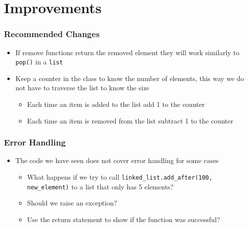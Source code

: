 \documentclass[11pt]{beamer}
\begin{document}
\section{Improvements}

	\begin{frame}
		\frametitle{Recommended Changes}
		\begin{itemize}
			\item If remove functions return the removed element they will work similarly to \texttt{pop()} in a \texttt{list} 
			\item Keep a counter in the class to know the number of elements, this way we do not have to traverse the list to know the size 
			\begin{itemize}
				\item Each time an item is added to the list add 1 to the counter
				\item Each time an item is removed from the list subtract 1 to the counter
			\end{itemize}
		\end{itemize}
	\end{frame}

	\begin{frame}
		\frametitle{Error Handling}
		\begin{itemize}
			\item The code we have seen does not cover error handling for some cases
			\begin{itemize}
				\item What happens if we try to call \lstinline|linked_list.add_after(100, new_element)| to a list that only has 5 elements?
				\item Should we raise an exception?
				\item Use the return statement to show if the function was successful? 
			\end{itemize}
		\end{itemize}
	\end{frame}
\end{document}
